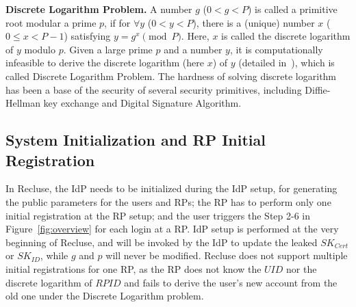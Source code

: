 \noindent\textbf{Discrete Logarithm Problem.} A number $g$ ($0<g<P$) is called a primitive root modular a prime $p$, if for ${\forall}y$ ($0<y<P$), there is a (unique) number $x$ ($0\le x <P-1$) satisfying $y=g^x \pmod P$. Here, $x$ is called the discrete logarithm of $y$ modulo $p$. Given a large prime $p$ and a number $y$, it is computationally infeasible to derive the discrete logarithm (here $x$) of $y$ (detailed in~\cite{WXWM}), which is called  Discrete Logarithm Problem. The hardness of solving discrete logarithm has been a base of the security of several security primitives, including Diffie-Hellman key exchange and Digital Signature Algorithm.

\subsection{System Initialization and RP Initial Registration}
In Recluse, the IdP needs to be initialized during the IdP setup, for generating the public parameters for the users and RPs; the RP has to perform only one initial registration at the RP setup; and  the user triggers the Step 2-6 in Figure~\ref{fig:overview} for each login at a RP. IdP setup is performed at the very beginning of Recluse, and will be invoked by the IdP to update the leaked $SK_{Cert}$ or $SK_{ID}$, while $g$ and $p$ will never be modified. Recluse does not support multiple initial registrations for one RP, as the RP does not know the $UID$ nor the discrete logarithm of $RPID$ and fails to derive the user's new account from the old one under the Discrete Logarithm problem.


